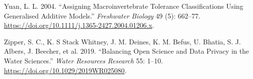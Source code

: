 \documentclass[fleqn,10pt,lineno]{wlpeerj} %
\begin{document}
\leavevmode\hypertarget{ref-Yuan04}{}%
Yuan, L. L. 2004. ``Assigning Macroinvertebrate Tolerance Classifications Using Generalised Additive Models.'' \emph{Freshwater Biology} 49 (5): 662--77. \url{https://doi.org/10.1111/j.1365-2427.2004.01206.x}.

\leavevmode\hypertarget{ref-Zipper19}{}%
Zipper, S. C., K. S Stack Whitney, J. M. Deines, K. M. Befus, U. Bhatia, S. J. Albers, J. Beecher, et al. 2019. ``Balancing Open Science and Data Privacy in the Water Sciences.'' \emph{Water Resources Research} 55: 1--10. \url{https://doi.org/10.1029/2019WR025080}.
\end{document}
